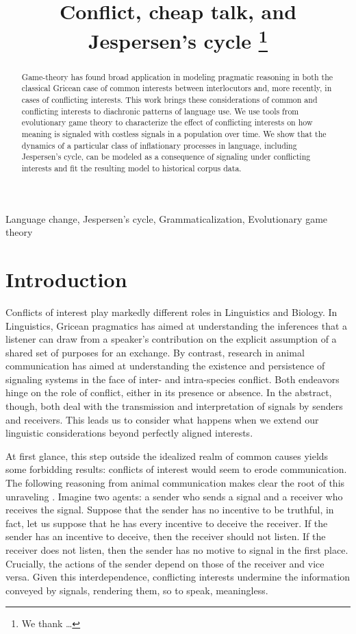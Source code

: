 \documentclass[linguex]{sp}
\title[Conflict, cheap talk, and Jespersen's cycle]{Conflict, cheap talk, and Jespersen's cycle \thanks{We thank  \ldots}}
\author[Ahern \& Clark]{ 
  \spauthor{Christopher Ahern \\ \institute{Department of Linguistics,\\ University of Pennsylvania}} \AND
  \spauthor{Robin Clark \\ \institute{Department of Linguistics,\\ University of Pennsylvania}}
}
\theoremstyle{definition} \newtheorem{definition}{Definition}
\begin{document}
\maketitle

\begin{abstract}
Game-theory has found broad application in modeling pragmatic reasoning in both the classical Gricean case of common interests between interlocutors and, more recently, in cases of conflicting interests. This work brings these considerations of common and conflicting interests to diachronic patterns of language use. We use tools from  evolutionary game theory to characterize the effect of conflicting interests on how meaning is signaled with costless signals in a population over time. We show that the dynamics of a particular class of inflationary processes in language, including Jespersen's cycle, can be modeled as a consequence of signaling under conflicting interests and fit the resulting model to historical corpus data.
\end{abstract}

\begin{keywords}
	 Language change, Jespersen's cycle, Grammaticalization, Evolutionary game theory
\end{keywords}

\section{Introduction}
\label{Introduction}

Conflicts of interest play markedly different roles in Linguistics and Biology. In Linguistics, Gricean pragmatics has aimed at understanding the inferences that a listener can draw from a speaker's contribution on the explicit assumption of a shared set of purposes for an exchange. By contrast, research in animal communication has aimed at understanding the existence and persistence of signaling systems in the face of inter- and intra-species conflict.  Both endeavors hinge on the role of conflict, either in its presence or absence. In the abstract, though, both deal with the transmission and interpretation of signals by senders and receivers. This leads us to consider what happens when we extend our linguistic considerations beyond perfectly aligned interests. 

At first glance, this step outside the idealized realm of common causes yields some forbidding results: conflicts of interest would seem to erode communication. The following reasoning from animal communication makes clear the root of this unraveling \citep{searcy-nowicki:2005}. Imagine two agents: a sender who sends a signal and a receiver who receives the signal. Suppose that the sender has no incentive to be truthful, in fact, let us suppose that he has every incentive to deceive the receiver. If the sender has an incentive to deceive, then the receiver should not listen. If the receiver does not listen, then the sender has no motive to signal in the first place. Crucially, the actions of the sender depend on those of the receiver and vice versa. Given this interdependence, conflicting interests undermine the information conveyed by signals, rendering them, so to speak, meaningless. 
\end{document}
